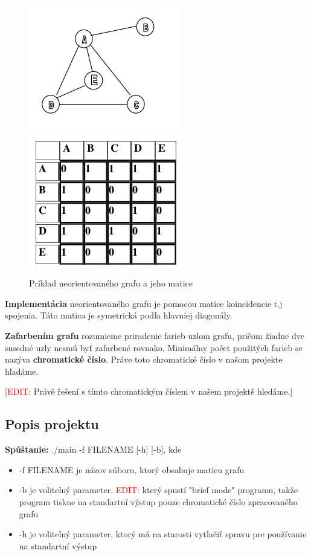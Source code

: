\documentclass[a4paper,11pt]{article}
\begin{document}
\begin{figure}[h]
  \centering
  \includegraphics[scale=0.60]{neor_graf.png}\includegraphics[scale=0.58]{matrix_n_graf.png}
  \caption{Príklad neorientovaného grafu a jeho matice}
  \label{fig:graf}
\end{figure}

\textbf{Implementácia} neorientovaného grafu je pomocou matice koincidencie t.j spojenia. Táto matica je symetrická podľa hlavniej diagonály.

\textbf{Zafarbením grafu} rozumieme priradenie farieb uzlom grafu, pričom žiadne dve susedné uzly nesmú byť zafarbené rovnako. Minimálny počet použitých farieb se nazýva \textbf{chromatické číslo}. Práve toto chromatické číslo v našom projekte hľadáme. 

[\textcolor{red}{EDIT: }Právě řešení s tímto chromatickým číslem v našem projektě hledáme.]

\subsection{Popis projektu}
\textbf{Spúštanie:} ./main -f FILENAME [-h] [-b], kde
\begin{itemize}
    \item -f FILENAME je názov súboru, ktorý obsahuje maticu grafu
    \item -b je volitelný parameter, \textcolor{red}{EDIT: } který spustí "brief mode" programu, takže program tiskne na standartní výstup pouze chromatické číslo zpracovaného grafu
    \item -h je volitelný parameter, ktorý má na starosti vytlačiť spravu pre používanie na standartní výstup
\end{itemize}
\end{document}
